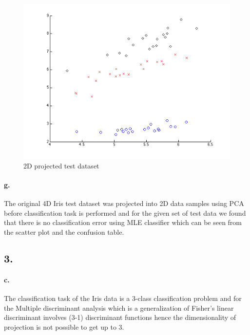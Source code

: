 \documentclass[a4paper]{article}
\begin{document}
\begin{figure}[H]
  \centering
    \includegraphics[scale=.47]{images/2_f.png}
  \caption{2D projected test dataset}
\end{figure}
\paragraph{g.} The original 4D Iris test dataset was projected into 2D data samples using PCA before classification task is performed and for the given set of test data we found that there is no classification error using MLE classifier which can be seen from the scatter plot and the confusion table.\\

\subsection*{3.}
\paragraph{c.} The classification task of the Iris data is a 3-class classification problem and for the Multiple discriminant analysis which is a generalization of Fisher's linear discriminant involves (3-1) discriminant functions hence the dimensionality of projection is not possible to get up to 3. \\

\newpage
\end{document}
